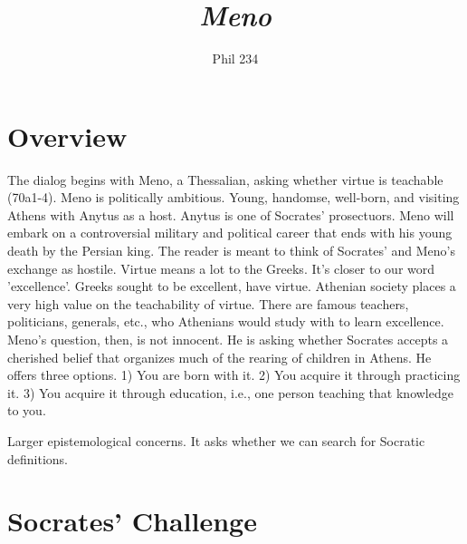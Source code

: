 \documentclass[10 pt]{article}
\begin{document}
\author{Phil 234}
\title{\emph{Meno}}
\maketitle

\section*{Overview}
The dialog begins with Meno, a Thessalian, asking whether virtue is teachable (70a1-4). Meno is politically ambitious. Young, handomse, well-born, and visiting Athens with Anytus as a host. Anytus is one of Socrates' prosectuors. Meno will embark on a controversial military and political career that ends with his young death by the Persian king. The reader is meant to think of Socrates' and Meno's exchange as hostile. Virtue means a lot to the Greeks. It's closer to our word 'excellence'. Greeks sought to be excellent, have virtue. Athenian society places a very high value on the teachability of virtue.  There are famous teachers, politicians, generals, etc., who Athenians would study with to learn excellence. Meno's question, then, is not innocent. He is asking whether Socrates accepts a cherished belief that organizes much of the rearing of children in Athens. He offers three options. 1) You are born with it. 2) You acquire it through practicing it. 3) You acquire it through education, i.e., one person teaching that knowledge to you. 

Larger epistemological concerns. It asks whether we can search for Socratic definitions. 


\section*{Socrates' Challenge}
\end{document}
